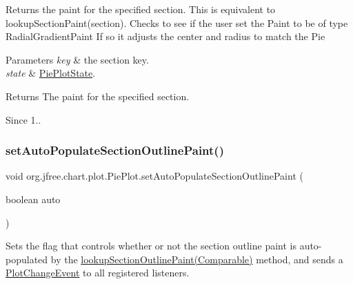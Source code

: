 Returns the paint for the specified section. This is equivalent to {\ttfamily lookup\+Section\+Paint(section)}. Checks to see if the user set the Paint to be of type Radial\+Gradient\+Paint If so it adjusts the center and radius to match the Pie


\begin{DoxyParams}{Parameters}
{\em key} & the section key. \\
\hline
{\em state} & \mbox{\hyperlink{classorg_1_1jfree_1_1chart_1_1plot_1_1_pie_plot_state}{Pie\+Plot\+State}}.\\
\hline
\end{DoxyParams}
\begin{DoxyReturn}{Returns}
The paint for the specified section.
\end{DoxyReturn}
\begin{DoxySince}{Since}
1.. 
\end{DoxySince}
\mbox{\label{classorg_1_1jfree_1_1chart_1_1plot_1_1_pie_plot_aca4ab53ff3369f59dce6538e97bbd637}} 
\subsubsection{\texorpdfstring{set\+Auto\+Populate\+Section\+Outline\+Paint()}{setAutoPopulateSectionOutlinePaint()}}
{\footnotesize\ttfamily void org.\+jfree.\+chart.\+plot.\+Pie\+Plot.\+set\+Auto\+Populate\+Section\+Outline\+Paint (\begin{DoxyParamCaption}\item[{boolean}]{auto }\end{DoxyParamCaption})}

Sets the flag that controls whether or not the section outline paint is auto-\/populated by the \mbox{\hyperlink{classorg_1_1jfree_1_1chart_1_1plot_1_1_pie_plot_a313892afd8de6bc0452c5c8c06d076fc}{lookup\+Section\+Outline\+Paint(\+Comparable)}} method, and sends a \mbox{\hyperlink{}{Plot\+Change\+Event}} to all registered listeners.


